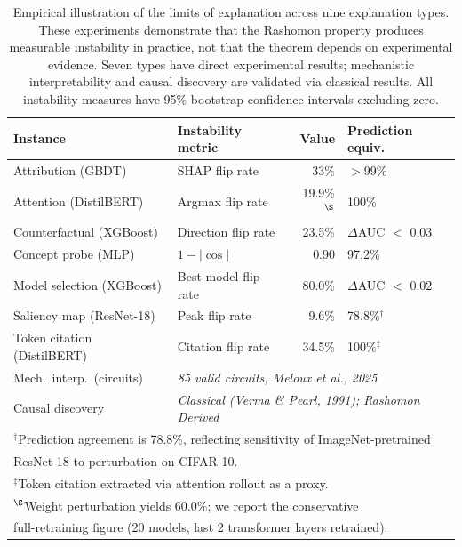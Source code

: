 \documentclass{article}
\begin{document}
\begin{table}[t]
\centering
\caption{Empirical illustration of the limits of explanation across nine explanation types. These experiments demonstrate that the Rashomon property produces measurable instability in practice, not that the theorem depends on experimental evidence. Seven types have direct experimental results; mechanistic interpretability and causal discovery are validated via classical results. All instability measures have 95\% bootstrap confidence intervals excluding zero.}
\label{tab:cross-instance}
\begin{tabular}{llrl}
\toprule
Instance & Instability metric & Value & Prediction equiv. \\
\midrule
Attribution (GBDT) & SHAP flip rate & 33\% & $>$99\% \\
Attention (DistilBERT) & Argmax flip rate & 19.9\%$^{\S}$ & 100\% \\
Counterfactual (XGBoost) & Direction flip rate & 23.5\% & $\Delta$AUC $<$ 0.03 \\
Concept probe (MLP) & $1 - |\cos|$ & 0.90 & 97.2\% \\
Model selection (XGBoost) & Best-model flip rate & 80.0\% & $\Delta$AUC $<$ 0.02 \\
Saliency map (ResNet-18) & Peak flip rate & 9.6\% & 78.8\%$^{\dagger}$ \\
Token citation (DistilBERT) & Citation flip rate & 34.5\% & 100\%$^{\ddagger}$ \\
Mech.\ interp.\ (circuits) & \multicolumn{3}{l}{\textit{85 valid circuits, Meloux et al., 2025}} \\
Causal discovery & \multicolumn{3}{l}{\textit{Classical (Verma \& Pearl, 1991); Rashomon Derived}} \\
\bottomrule
\multicolumn{4}{l}{$^{\dagger}$Prediction agreement is 78.8\%, reflecting sensitivity of ImageNet-pretrained} \\
\multicolumn{4}{l}{\quad ResNet-18 to perturbation on CIFAR-10.} \\
\multicolumn{4}{l}{$^{\ddagger}$Token citation extracted via attention rollout as a proxy.} \\
\multicolumn{4}{l}{$^{\S}$Weight perturbation yields 60.0\%; we report the conservative} \\
\multicolumn{4}{l}{\quad full-retraining figure (20 models, last 2 transformer layers retrained).} \\
\end{tabular}
\end{table}
\end{document}
